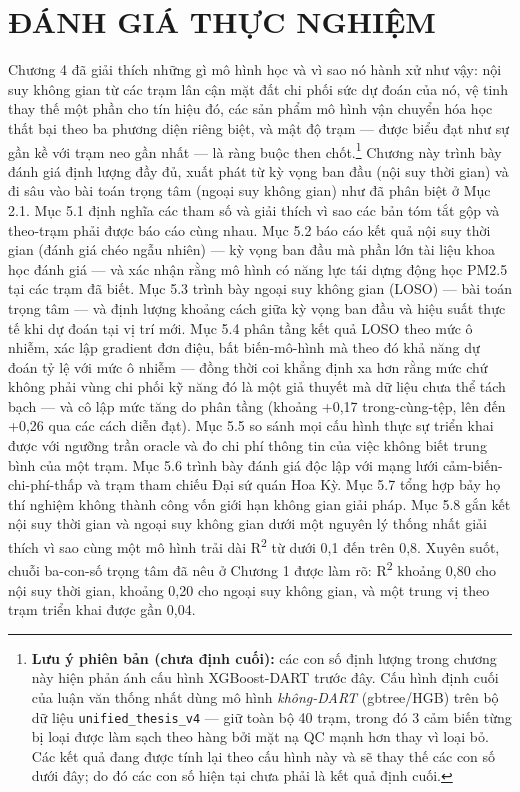 \chapter{ĐÁNH GIÁ THỰC NGHIỆM}
\label{chuong5}


Chương 4 đã giải thích những gì mô hình học và vì sao nó hành xử như vậy: nội suy không gian từ các trạm lân cận mặt đất chi phối sức dự đoán của nó, vệ tinh thay thế một phần cho tín hiệu đó, các sản phẩm mô hình vận chuyển hóa học thất bại theo ba phương diện riêng biệt, và mật độ trạm --- được biểu đạt như sự gần kề với trạm neo gần nhất --- là ràng buộc then chốt.\footnote{\textbf{Lưu ý phiên bản (chưa định cuối):} các con số định lượng trong chương này hiện phản ánh cấu hình XGBoost-DART trước đây. Cấu hình định cuối của luận văn thống nhất dùng mô hình \emph{không-DART} (gbtree/HGB) trên bộ dữ liệu \texttt{unified\_thesis\_v4} --- giữ toàn bộ 40 trạm, trong đó 3 cảm biến từng bị loại được làm sạch theo hàng bởi mặt nạ QC mạnh hơn thay vì loại bỏ. Các kết quả đang được tính lại theo cấu hình này và sẽ thay thế các con số dưới đây; do đó các con số hiện tại chưa phải là kết quả định cuối.} Chương này trình bày đánh giá định lượng đầy đủ, xuất phát từ kỳ vọng ban đầu (nội suy thời gian) và đi sâu vào bài toán trọng tâm (ngoại suy không gian) như đã phân biệt ở Mục 2.1. Mục 5.1 định nghĩa các tham số và giải thích vì sao các bản tóm tắt gộp và theo-trạm phải được báo cáo cùng nhau. Mục 5.2 báo cáo kết quả nội suy thời gian (đánh giá chéo ngẫu nhiên) --- kỳ vọng ban đầu mà phần lớn tài liệu khoa học đánh giá --- và xác nhận rằng mô hình có năng lực tái dựng động học PM2.5 tại các trạm đã biết. Mục 5.3 trình bày ngoại suy không gian (LOSO) --- bài toán trọng tâm --- và định lượng khoảng cách giữa kỳ vọng ban đầu và hiệu suất thực tế khi dự đoán tại vị trí mới. Mục 5.4 phân tầng kết quả LOSO theo mức ô nhiễm, xác lập gradient đơn điệu, bất biến-mô-hình mà theo đó khả năng dự đoán tỷ lệ với mức ô nhiễm --- đồng thời coi khẳng định xa hơn rằng mức chứ không phải vùng chi phối kỹ năng đó là một giả thuyết mà dữ liệu chưa thể tách bạch --- và cô lập mức tăng do phân tầng (khoảng +0,17 trong-cùng-tệp, lên đến +0,26 qua các cách diễn đạt). Mục 5.5 so sánh mọi cấu hình thực sự triển khai được với ngưỡng trần oracle và đo chi phí thông tin của việc không biết trung bình của một trạm. Mục 5.6 trình bày đánh giá độc lập với mạng lưới cảm-biến-chi-phí-thấp và trạm tham chiếu Đại sứ quán Hoa Kỳ. Mục 5.7 tổng hợp bảy họ thí nghiệm không thành công vốn giới hạn không gian giải pháp. Mục 5.8 gắn kết nội suy thời gian và ngoại suy không gian dưới một nguyên lý thống nhất giải thích vì sao cùng một mô hình trải dài R\textsuperscript{2} từ dưới 0,1 đến trên 0,8. Xuyên suốt, chuỗi ba-con-số trọng tâm đã nêu ở Chương 1 được làm rõ: R\textsuperscript{2} khoảng 0,80 cho nội suy thời gian, khoảng 0,20 cho ngoại suy không gian, và một trung vị theo trạm triển khai được gần 0,04.


